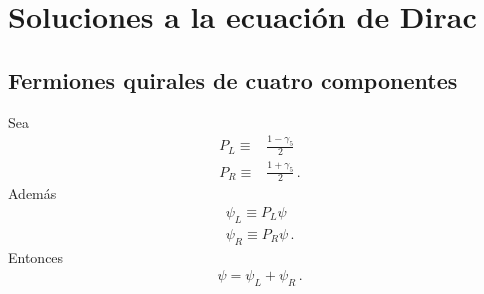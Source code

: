 \chapter{Soluciones a la ecuación de Dirac}
\label{cha:fermiones}



\section{Fermiones quirales de cuatro componentes}
\label{sec:ferm-quir-de}

Sea
\begin{align}
  P_L\equiv&\frac{1-\gamma_5}{2}\nonumber\\
  P_R\equiv&\frac{1+\gamma_5}{2}\,.
\end{align}
Además
\begin{align}
  \psi_L\equiv P_L\psi\nonumber\\
  \psi_R\equiv P_R\psi\,.
\end{align}
Entonces
\begin{align}
  \psi=\psi_L+\psi_R\,.
\end{align}

